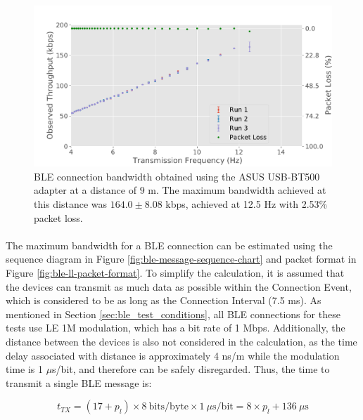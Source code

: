 \begin{figure}[H]
    \centering
    \includegraphics[width=0.9\linewidth]{images/ble-bandwidth-hci0-900cm.pdf}
    \caption[\acs{BLE} connection bandwidth obtained using the ASUS USB-BT500 adapter at a distance of 9 m.]{\acs{BLE} connection bandwidth obtained using the ASUS USB-BT500 adapter at a distance of $9\text{ m}$. The maximum bandwidth achieved at this distance was $164.0 \pm 8.08$ kbps, achieved at 12.5 Hz with 2.53\% packet loss.}
    \label{fig:ble-bandwidth-hci0-9m}
\end{figure}

\paragraph{} The maximum bandwidth for a \acs{BLE} connection can be estimated using the sequence diagram in Figure \ref{fig:ble-message-sequence-chart} and packet format in Figure \ref{fig:ble-ll-packet-format}. To simplify the calculation, it is assumed that the devices can transmit as much data as possible within the Connection Event, which is considered to be as long as the Connection Interval (7.5 ms). As mentioned in Section \ref{sec:ble_test_conditions}, all \acs{BLE} connections for these tests use LE 1M modulation, which has a bit rate of 1 Mbps. Additionally, the distance between the devices is also not considered in the calculation, as the time delay associated with distance is approximately 4 ns/m \cite{Specification1999} while the modulation time is 1 $\mu$s/bit, and therefore can be safely disregarded. Thus, the time to transmit a single \acs{BLE} message is:

\begin{equation}
    t_{TX} = (17 + p_{l}) \times 8\ \text{bits/byte} \times 1\ \mu\text{s}/\text{bit} = 8\times p_l + 136\ \mu\text{s}
\end{equation}

